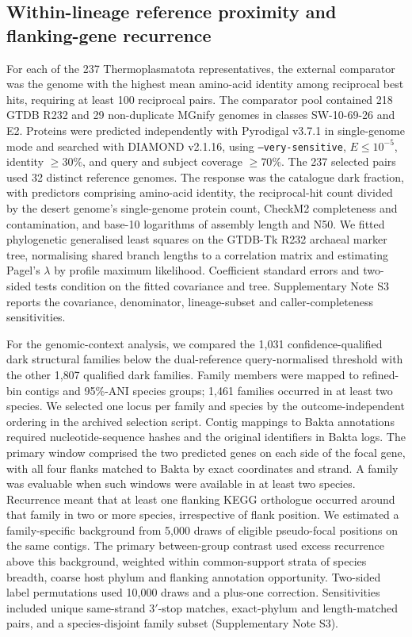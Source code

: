 \documentclass[11pt]{article}
\begin{document}
\subsection*{Within-lineage reference proximity and flanking-gene recurrence}
For each of the 237 Thermoplasmatota representatives, the external comparator was the genome
with the highest mean amino-acid identity among reciprocal best hits, requiring at least 100
reciprocal pairs. The comparator pool contained 218 GTDB R232 and 29 non-duplicate MGnify genomes
in classes SW-10-69-26 and E2. Proteins were predicted independently with Pyrodigal v3.7.1 in
single-genome mode and searched with DIAMOND v2.1.16, using \texttt{--very-sensitive},
$E\leq10^{-5}$, identity $\geq30\%$, and query and subject coverage $\geq70\%$.
The 237 selected pairs used 32 distinct reference genomes. The response was the catalogue dark
fraction, with predictors comprising amino-acid identity, the reciprocal-hit count divided by
the desert genome's single-genome protein count, CheckM2 completeness and contamination, and
base-10 logarithms of assembly length and N50. We fitted phylogenetic generalised least squares
on the GTDB-Tk R232 archaeal marker tree, normalising shared branch lengths to a correlation
matrix and estimating Pagel's $\lambda$ by profile maximum likelihood. Coefficient standard
errors and two-sided tests condition on the fitted covariance and tree. Supplementary Note S3
reports the covariance, denominator, lineage-subset and caller-completeness sensitivities.

For the genomic-context analysis, we compared the 1{,}031 confidence-qualified dark structural
families below the dual-reference query-normalised threshold with the other 1{,}807 qualified
dark families. Family members were mapped to refined-bin contigs and 95\%-ANI species groups;
1{,}461 families occurred in at least two species. We selected one locus per family and species
by the outcome-independent ordering in the archived selection script. Contig mappings to Bakta
annotations required nucleotide-sequence hashes and the original identifiers in Bakta logs.
The primary window comprised the two predicted genes on each side of the focal gene, with all
four flanks matched to Bakta by exact coordinates and strand. A family was evaluable when such
windows were available in at least two species. Recurrence meant that at least one flanking KEGG
orthologue occurred around that family in two or more species, irrespective of flank position.
We estimated a family-specific background from 5{,}000 draws of eligible pseudo-focal positions
on the same contigs. The primary between-group contrast used excess recurrence above this
background, weighted within common-support strata of species breadth, coarse host phylum and
flanking annotation opportunity. Two-sided label permutations used 10{,}000 draws and a plus-one
correction. Sensitivities included unique same-strand 3$'$-stop matches, exact-phylum and
length-matched pairs, and a species-disjoint family subset (Supplementary Note S3).
\end{document}
